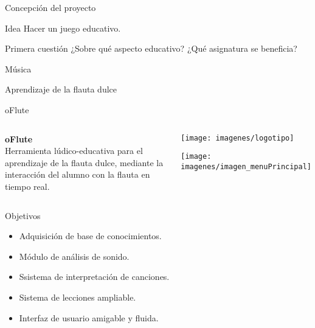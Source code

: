 \documentclass[11pt,xcolor=svgnames]{beamer}
\begin{document}
\begin{frame}{Concepción del proyecto}
  \begin{block}{Idea}
    Hacer un juego educativo.
  \end{block}

  \pause

  \begin{block}{Primera cuestión}
    ¿Sobre qué aspecto educativo? ¿Qué asignatura se beneficia?
  \end{block}

  \vspace{0.5cm}
  \pause

  \begin{center}
    \LARGE Música \\[0.5cm]

    \pause

    \LARGE Aprendizaje de la flauta dulce
  \end{center}
\end{frame}
{

\begin{frame}{oFlute}
  \begin{columns}

    \begin{block}{}
      \begin{center}
        \textbf{oFlute}\\
        Herramienta lúdico-educativa para el aprendizaje de la flauta dulce, 
        mediante la interacción del alumno con la flauta en tiempo real.
      \end{center}
    \end{block}

    \begin{block}{}
      \begin{center}
        \vspace{-1.5cm}
        \texttt{[image: imagenes/logotipo]}

        \bigskip
        \bigskip

        \texttt{[image: imagenes/imagen\_menuPrincipal]}
      \end{center}
    \end{block}   
  \end{columns}
\end{frame}
}

\begin{frame}{Objetivos}
  \Large
  \begin{itemize}
  \item Adquisición de base de conocimientos. \pause
  \item Módulo de análisis de sonido. \pause
  \item Ssistema de interpretación de canciones. \pause
  \item Sistema de lecciones ampliable. \pause
  \item Interfaz de usuario amigable y fluida.
  \end{itemize}
\end{frame}
\end{document}
